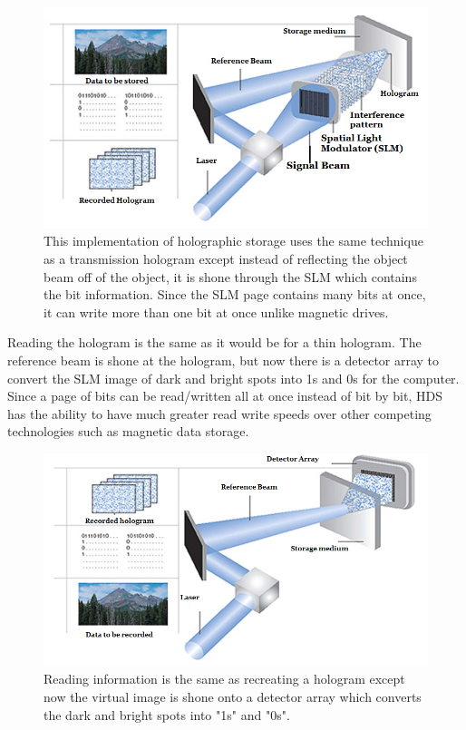 \documentclass[ notitlepage, numerical, 11pt]{revtex4-1} %
\begin{document}
\begin{figure}[H]
\centerline{\includegraphics[scale=.45]{dataHologramCreate.png}}
\caption{This implementation of holographic storage uses the same technique as a transmission hologram except instead of reflecting the object beam off of the object, it is shone through the SLM which contains the bit information. Since the SLM page contains many bits at once, it can write more than one bit at once unlike magnetic drives.}
\label{dataHologramCreate}
\end{figure} 
Reading the hologram is the same as it would be for a thin hologram. The reference beam is shone at the hologram, but now there is a detector array to convert the SLM image of dark and bright spots into 1s and 0s for the computer. Since a page of bits can be read/written all at once instead of bit by bit, HDS has the ability to have much greater read write speeds over other competing technologies such as magnetic data storage.
\begin{figure}[H]
\centerline{\includegraphics[scale=.45]{dataHologramReconstruct.png}}
\caption{Reading information is the same as recreating a hologram except now the virtual image is shone onto a detector array which converts the dark and bright spots into "1s" and "0s".}
\label{dataHologramReconstruct}
\end{figure} 
\end{document}
